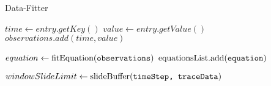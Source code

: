 \begin{algorithm}
	\caption{Data-Fitter}
	\label{dataFitter}
	\begin{algorithmic}[1]
		
%		
%		
		
			\State $time\gets entry.getKey()$
			\State $value\gets entry.getValue()$
			\State $observations.add(time,value)$
		\EndFor
		
		\State $equation\gets \textrm{fitEquation}(\texttt{observations})$
		\State $\textrm{equationsList.add}(\texttt{equation})$
		
		
		\State $ windowSlideLimit \gets \textrm{slideBuffer}(\texttt{timeStep, traceData})$
		
		\EndWhile
		
		\EndProcedure
	\end{algorithmic}
\end{algorithm}
	